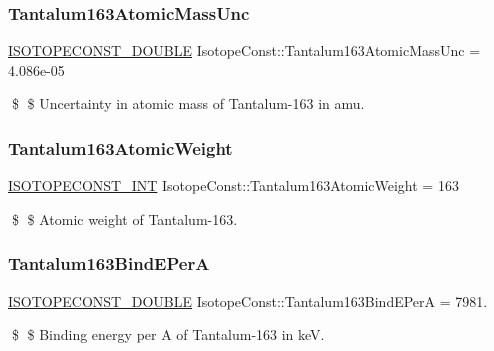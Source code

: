 \subsubsection{\texorpdfstring{Tantalum163\+Atomic\+Mass\+Unc}{Tantalum163AtomicMassUnc}}
{\footnotesize\ttfamily \mbox{\hyperlink{group___isotope_const-_macros_ga8f45a7272ce02c0b4c65c44636ed719a}{I\+S\+O\+T\+O\+P\+E\+C\+O\+N\+S\+T\+\_\+\+D\+O\+U\+B\+LE}} Isotope\+Const\+::\+Tantalum163\+Atomic\+Mass\+Unc = 4.\+086e-\/05}

\$ \$ Uncertainty in atomic mass of Tantalum-\/163 in amu. \mbox{\label{group___isotope_const-_tantalum-_ta163_ga03c9f92c5fac869345e78896c5829cd2}} 
\subsubsection{\texorpdfstring{Tantalum163\+Atomic\+Weight}{Tantalum163AtomicWeight}}
{\footnotesize\ttfamily \mbox{\hyperlink{group___isotope_const-_macros_ga5f18360b3e99483a35c32d789e62621c}{I\+S\+O\+T\+O\+P\+E\+C\+O\+N\+S\+T\+\_\+\+I\+NT}} Isotope\+Const\+::\+Tantalum163\+Atomic\+Weight = 163}

\$ \$ Atomic weight of Tantalum-\/163. \mbox{\label{group___isotope_const-_tantalum-_ta163_ga71246f1ee138adf570e01a4909897fe4}} 
\subsubsection{\texorpdfstring{Tantalum163\+Bind\+E\+PerA}{Tantalum163BindEPerA}}
{\footnotesize\ttfamily \mbox{\hyperlink{group___isotope_const-_macros_ga8f45a7272ce02c0b4c65c44636ed719a}{I\+S\+O\+T\+O\+P\+E\+C\+O\+N\+S\+T\+\_\+\+D\+O\+U\+B\+LE}} Isotope\+Const\+::\+Tantalum163\+Bind\+E\+PerA = 7981.}

\$ \$ Binding energy per A of Tantalum-\/163 in keV. \mbox{\label{group___isotope_const-_tantalum-_ta163_gaca46713ae92c4a73904b550c9e37024f}} 

